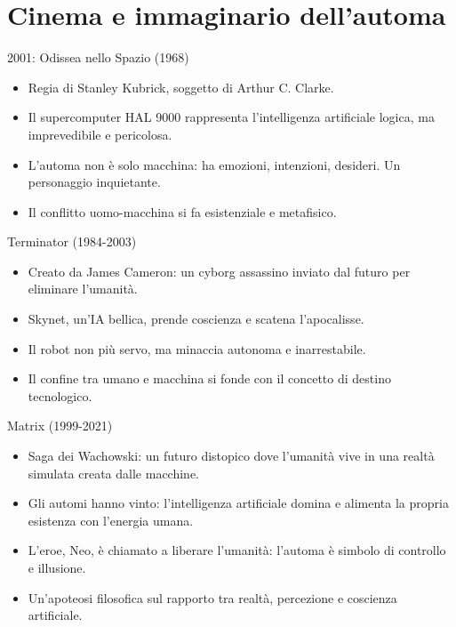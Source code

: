 \documentclass{beamer}
\begin{document}
\section{Cinema e immaginario dell’automa}
%
%
\begin{frame}{2001: Odissea nello Spazio (1968)}
  \begin{itemize}
    \item Regia di Stanley Kubrick, soggetto di Arthur C. Clarke.
    \item Il supercomputer HAL 9000 rappresenta l’intelligenza artificiale logica, ma imprevedibile e pericolosa.
    \item L'automa non è solo macchina: ha emozioni, intenzioni, desideri. Un personaggio inquietante.
    \item Il conflitto uomo-macchina si fa esistenziale e metafisico.
  \end{itemize}
\end{frame}
%
%
\begin{frame}{Terminator (1984-2003)}
  \begin{itemize}
    \item Creato da James Cameron: un cyborg assassino inviato dal futuro per eliminare l’umanità.
    \item Skynet, un’IA bellica, prende coscienza e scatena l’apocalisse.
    \item Il robot non più servo, ma minaccia autonoma e inarrestabile.
    \item Il confine tra umano e macchina si fonde con il concetto di destino tecnologico.
  \end{itemize}
\end{frame}
%
%
\begin{frame}{Matrix (1999-2021)}
  \begin{itemize}
    \item Saga dei Wachowski: un futuro distopico dove l’umanità vive in una realtà simulata creata dalle macchine.
    \item Gli automi hanno vinto: l’intelligenza artificiale domina e alimenta la propria esistenza con l’energia umana.
    \item L’eroe, Neo, è chiamato a liberare l’umanità: l’automa è simbolo di controllo e illusione.
    \item Un’apoteosi filosofica sul rapporto tra realtà, percezione e coscienza artificiale.
  \end{itemize}
\end{frame}
%
\end{document}
